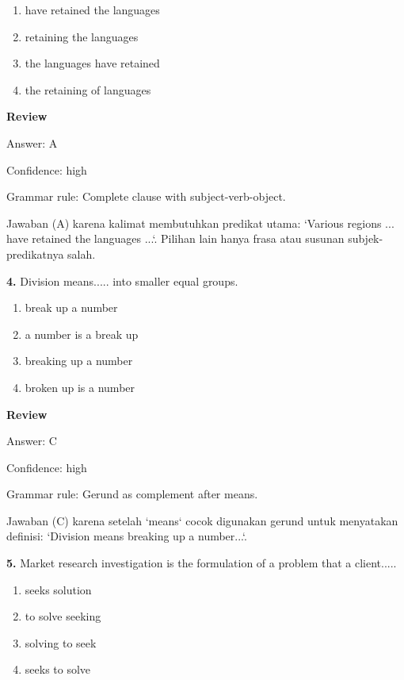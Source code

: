 \documentclass[12pt]{article}
\begin{document}
\begin{enumerate}[label=(\Alph*),leftmargin=*,itemsep=0.2em]
\item have retained the languages
\item retaining the languages
\item the languages have retained
\item the retaining of languages
\end{enumerate}
\par
\begingroup
\setlength{\parskip}{0pt}
\setlength{\parindent}{0pt}
\textbf{Review}\par
Answer: A\par
Confidence: high\par
Grammar rule: Complete clause with subject-verb-object.\par
Jawaban (A) karena kalimat membutuhkan predikat utama: `Various regions ... have retained the languages ...`. Pilihan lain hanya frasa atau susunan subjek-predikatnya salah.\par
\endgroup
\par
\vspace{0.25\baselineskip}
\noindent\textbf{4.} Division means..... into smaller equal groups.
\begin{enumerate}[label=(\Alph*),leftmargin=*,itemsep=0.2em]
\item break up a number
\item a number is a break up
\item breaking up a number
\item broken up is a number
\end{enumerate}
\par
\begingroup
\setlength{\parskip}{0pt}
\setlength{\parindent}{0pt}
\textbf{Review}\par
Answer: C\par
Confidence: high\par
Grammar rule: Gerund as complement after means.\par
Jawaban (C) karena setelah `means` cocok digunakan gerund untuk menyatakan definisi: `Division means breaking up a number...`.\par
\endgroup
\par
\vspace{0.25\baselineskip}
\noindent\textbf{5.} Market research investigation is the formulation of a problem that a client.....
\begin{enumerate}[label=(\Alph*),leftmargin=*,itemsep=0.2em]
\item seeks solution
\item to solve seeking
\item solving to seek
\item seeks to solve
\end{enumerate}
\end{document}
